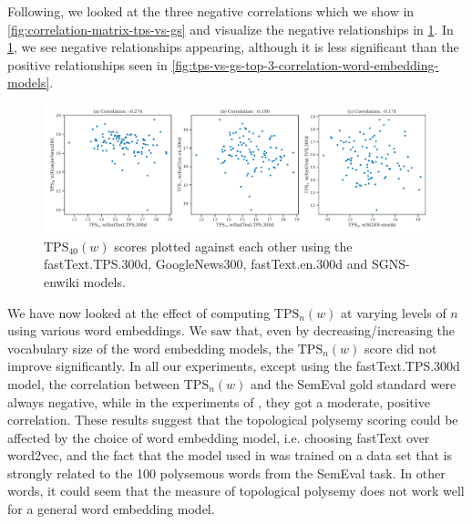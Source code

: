 Following, we looked at the three negative correlations which we show in \cref{fig:correlation-matrix-tps-vs-gs} and visualize the negative relationships in \cref{fig:tps-vs-gs-top-3-negative-correlation-word-embedding-models}. In \cref{fig:tps-vs-gs-top-3-negative-correlation-word-embedding-models}, we see negative relationships appearing, although it is less significant than the positive relationships seen in \cref{fig:tps-vs-gs-top-3-correlation-word-embedding-models}.
\begin{figure}[H]
    \centering
    \includegraphics[width=\textwidth]{thesis/figures/tps-vs-gs-top-3-negative-correlation-word-embedding-models.pdf}
    \caption{$\text{TPS}_{40}(w)$ scores plotted against each other using the fastText.TPS.300d, GoogleNews300, fastText.en.300d and SGNS-enwiki models.}
    \label{fig:tps-vs-gs-top-3-negative-correlation-word-embedding-models}
\end{figure}

We have now looked at the effect of computing $\text{TPS}_n(w)$ at varying levels of $n$ using various word embeddings. We saw that, even by decreasing/increasing the vocabulary size of the word embedding models, the $\text{TPS}_n(w)$ score did not improve significantly. In all our experiments, except using the fastText.TPS.300d model, the correlation between $\text{TPS}_n(w)$ and the SemEval gold standard were always negative, while in the experiments of \cite{jakubowski2020topology}, they got a moderate, positive correlation. These results suggest that the topological polysemy scoring could be affected by the choice of word embedding model, i.e. choosing fastText over word2vec, and the fact that the model used in \cite{jakubowski2020topology} was trained on a data set that is strongly related to the 100 polysemous words from the SemEval task. In other words, it could seem that the measure of topological polysemy does not work well for a general word embedding model.

